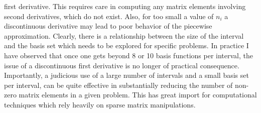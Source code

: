 first derivative.  This requires care in computing any matrix elements involving
second derivatives, which do not exist.  Also, for too small a value of $n_{i}$ 
a discontinuous derivative may lead to poor behavior of the piecewise approximation.
Clearly, there is a relationship between the size of the interval and the basis set 
which needs to be explored for specific problems.  In practice I have observed 
that once one gets beyond 8 or 10 basis functions per interval, the issue of a 
discontinuous first derivative is no longer of practical consequence.  Importantly, 
a judicious use of a large number of intervals and a small basis set per interval, 
can be quite effective in substantially reducing the number of non-zero matrix 
elements in a given problem.  This has great import for computational techniques 
which rely heavily on sparse matrix manipulations.

